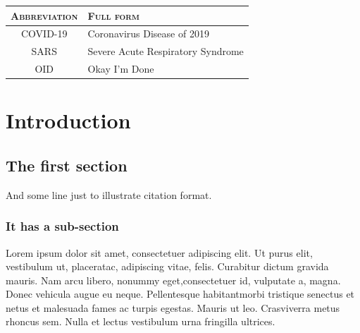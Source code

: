 \documentclass[a4paper, oneside, 11pt]{book}
\begin{document}
\begin{center}
\begin{tabular}{| c | l |}
\hline
	\textsc{Abbreviation} & \textsc{Full form}\\
	\hline\hline
  COVID-19 & Coronavirus Disease of 2019 \\
  SARS & Severe Acute Respiratory Syndrome \\
  OID & Okay I'm Done \\
  \hline
	\end{tabular}
\end{center}

{
\hypersetup{linkcolor=black}
\begin{singlespace}
\newpage\tableofcontents
\newpage\listoffigures
\newpage\listoftables
\end{singlespace}
}


\newpage
{}
\mainmatter

\chapter{Introduction}
\label{ch:intro}

\section{The first section}
\label{sec:firstone}
\lipsum[1] And some line just to illustrate citation \supercite{example} format.

  \subsection{It has a sub-section}

  Lorem ipsum dolor sit amet, consectetuer adipiscing elit. Ut purus elit, vestibulum ut, placeratac, adipiscing vitae, felis. Curabitur dictum gravida mauris. Nam arcu libero, nonummy eget,consectetuer id, vulputate a, magna. Donec vehicula augue eu neque. Pellentesque habitantmorbi tristique senectus et netus et malesuada fames ac turpis egestas. Mauris ut leo. Crasviverra metus rhoncus sem. Nulla et lectus vestibulum urna fringilla ultrices.
\end{document}
